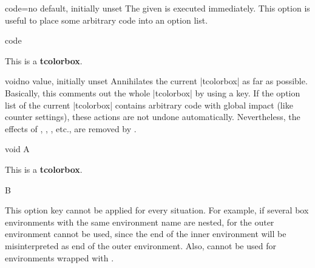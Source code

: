 \begin{docTcbKey}{code}{=}{no default, initially unset}
  The given  is executed immediately. This option is useful
  to place some arbitrary code into an option list.
\begin{exdispExample}{code}

\begin{tcolorbox}[code={\newcommand{\mycommand}{\textit{working}}},
  title=My \mycommand\ title]
This is a \textbf{tcolorbox}.
\end{tcolorbox}
\end{exdispExample}
\end{docTcbKey}


\clearpage
\begin{docTcbKey}[][doc new=2016-10-21]{void}{}{no value, initially unset}
  Annihilates the current |tcolorbox| as far as possible.
  Basically, this comments out the whole |tcolorbox| by using a key.
  If the option list of the current |tcolorbox| contains arbitrary code with global
  impact (like counter settings), these actions are not undone automatically.
  Nevertheless, the effects of , ,
  , etc., are removed by .

\begin{exdispExample}{void}
A%
  \begin{tcolorbox}[
      title=This box is completely removed by the following key,
      void
    ]
  This is a \textbf{tcolorbox}.
  \end{tcolorbox}
B
\end{exdispExample}

\begin{marker}
  This option key cannot be applied for every situation.
  For example, if several box environments with the same environment name
  are nested, for the outer environment  cannot be used,
  since the end of the inner environment will be misinterpreted as
  end of the outer environment. Also,  cannot be used
  for environments wrapped with .
\end{marker}
\end{docTcbKey}


